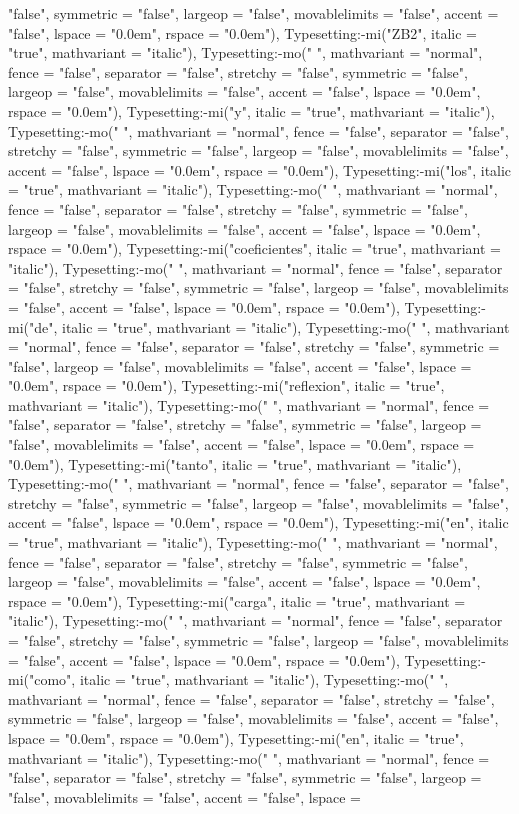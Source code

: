 \documentclass{article}
\begin{document}
\begin{Maple Normal}
{\begin{Maple Normal}
{"false", symmetric = "false", largeop = "false", movablelimits = "false", accent = "false", lspace = "0.0em", rspace = "0.0em"), Typesetting:-mi("ZB2", italic = "true", mathvariant = "italic"), Typesetting:-mo(" ", mathvariant = "normal", fence = "false", separator = "false", stretchy = "false", symmetric = "false", largeop = "false", movablelimits = "false", accent = "false", lspace = "0.0em", rspace = "0.0em"), Typesetting:-mi("y", italic = "true", mathvariant = "italic"), Typesetting:-mo(" ", mathvariant = "normal", fence = "false", separator = "false", stretchy = "false", symmetric = "false", largeop = "false", movablelimits = "false", accent = "false", lspace = "0.0em", rspace = "0.0em"), Typesetting:-mi("los", italic = "true", mathvariant = "italic"), Typesetting:-mo(" ", mathvariant = "normal", fence = "false", separator = "false", stretchy = "false", symmetric = "false", largeop = "false", movablelimits = "false", accent = "false", lspace = "0.0em", rspace = "0.0em"), Typesetting:-mi("coeficientes", italic = "true", mathvariant = "italic"), Typesetting:-mo(" ", mathvariant = "normal", fence = "false", separator = "false", stretchy = "false", symmetric = "false", largeop = "false", movablelimits = "false", accent = "false", lspace = "0.0em", rspace = "0.0em"), Typesetting:-mi("de", italic = "true", mathvariant = "italic"), Typesetting:-mo(" ", mathvariant = "normal", fence = "false", separator = "false", stretchy = "false", symmetric = "false", largeop = "false", movablelimits = "false", accent = "false", lspace = "0.0em", rspace = "0.0em"), Typesetting:-mi("reflexion", italic = "true", mathvariant = "italic"), Typesetting:-mo(" ", mathvariant = "normal", fence = "false", separator = "false", stretchy = "false", symmetric = "false", largeop = "false", movablelimits = "false", accent = "false", lspace = "0.0em", rspace = "0.0em"), Typesetting:-mi("tanto", italic = "true", mathvariant = "italic"), Typesetting:-mo(" ", mathvariant = "normal", fence = "false", separator = "false", stretchy = "false", symmetric = "false", largeop = "false", movablelimits = "false", accent = "false", lspace = "0.0em", rspace = "0.0em"), Typesetting:-mi("en", italic = "true", mathvariant = "italic"), Typesetting:-mo(" ", mathvariant = "normal", fence = "false", separator = "false", stretchy = "false", symmetric = "false", largeop = "false", movablelimits = "false", accent = "false", lspace = "0.0em", rspace = "0.0em"), Typesetting:-mi("carga", italic = "true", mathvariant = "italic"), Typesetting:-mo(" ", mathvariant = "normal", fence = "false", separator = "false", stretchy = "false", symmetric = "false", largeop = "false", movablelimits = "false", accent = "false", lspace = "0.0em", rspace = "0.0em"), Typesetting:-mi("como", italic = "true", mathvariant = "italic"), Typesetting:-mo(" ", mathvariant = "normal", fence = "false", separator = "false", stretchy = "false", symmetric = "false", largeop = "false", movablelimits = "false", accent = "false", lspace = "0.0em", rspace = "0.0em"), Typesetting:-mi("en", italic = "true", mathvariant = "italic"), Typesetting:-mo(" ", mathvariant = "normal", fence = "false", separator = "false", stretchy = "false", symmetric = "false", largeop = "false", movablelimits = "false", accent = "false", lspace = }
\end{Maple Normal}}
\end{Maple Normal}
\end{document}
